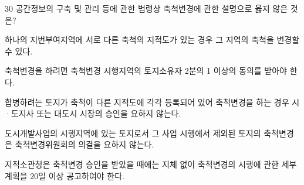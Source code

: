 \begin{question}{30}
공간정보의 구축 및 관리 등에 관한 법령상 축척변경에 관한 설명으로 옳지 않은 것은?
\begin{choices}
  \item 하나의 지번부여지역에 서로 다른 축척의 지적도가 있는 경우 그 지역의 축척을 변경할 수 있다.
  \item 축척변경을 하려면 축척변경 시행지역의 토지소유자 2분의 1 이상의 동의를 받아야 한다.
  \item 합병하려는 토지가 축척이 다른 지적도에 각각 등록되어 있어 축척변경을 하는 경우 시·도지사 또는 대도시 시장의 승인을 요하지 않는다.
  \item 도시개발사업의 시행지역에 있는 토지로서 그 사업 시행에서 제외된 토지의 축척변경은 축척변경위원회의 의결을 요하지 않는다.
  \item 지적소관청은 축척변경 승인을 받았을 때에는 지체 없이 축척변경의 시행에 관한 세부계획을 20일 이상 공고하여야 한다.
\end{choices}
\end{question}
